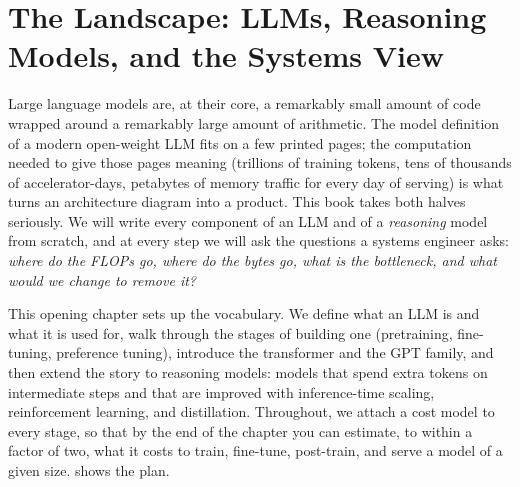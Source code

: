 \chapter{The Landscape: LLMs, Reasoning Models, and the Systems View}\label{ch:landscape}

Large language models are, at their core, a remarkably small amount of code wrapped around a
remarkably large amount of arithmetic. The model definition of a modern open-weight LLM fits on a
few printed pages; the computation needed to give those pages meaning (trillions of training tokens,
tens of thousands of accelerator-days, petabytes of memory traffic for every day of serving) is what
turns an architecture diagram into a product. This book takes both halves seriously. We will write every
component of an LLM and of a \emph{reasoning} model from scratch, and at every step we will ask the
questions a systems engineer asks: \emph{where do the FLOPs go, where do the bytes go, what is the
bottleneck, and what would we change to remove it?}

This opening chapter sets up the vocabulary. We define what an LLM is and what it is used for, walk
through the stages of building one (pretraining, fine-tuning, preference tuning), introduce the
transformer and the GPT family, and then extend the story to reasoning models: models that spend extra
tokens on intermediate steps and that are improved with inference-time scaling, reinforcement learning,
and distillation. Throughout, we attach a cost model to every stage, so that by the end of the chapter
you can estimate, to within a factor of two, what it costs to train, fine-tune, post-train, and serve a
model of a given size.  shows the plan.

